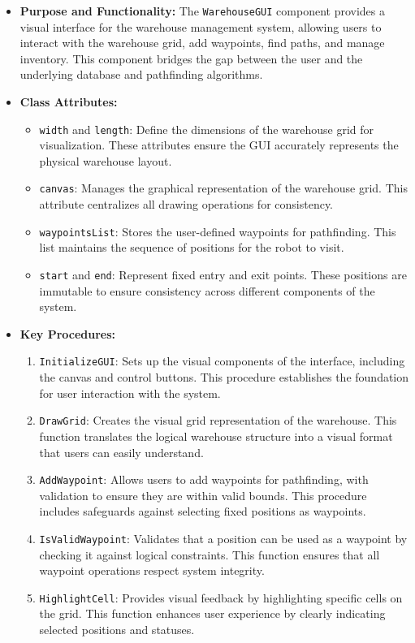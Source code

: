 \begin{itemize}
\item \textbf{Purpose and Functionality:}\newline
The \verb|WarehouseGUI| component provides a visual interface for the warehouse management system, allowing users to interact with the warehouse grid, add waypoints, find paths, and manage inventory. This component bridges the gap between the user and the underlying database and pathfinding algorithms.

\item \textbf{Class Attributes:}
\begin{itemize}
    \item {\verb|width| and \verb|length|:} Define the dimensions of the warehouse grid for visualization. These attributes ensure the GUI accurately represents the physical warehouse layout.
    \item {\verb|canvas|:} Manages the graphical representation of the warehouse grid. This attribute centralizes all drawing operations for consistency.
    \item {\verb|waypointsList|:} Stores the user-defined waypoints for pathfinding. This list maintains the sequence of positions for the robot to visit.
    \item {\verb|start| and \verb|end|:} Represent fixed entry and exit points. These positions are immutable to ensure consistency across different components of the system.
\end{itemize}

\item \textbf{Key Procedures:}
\begin{enumerate}
    \item {\verb|InitializeGUI|:} Sets up the visual components of the interface, including the canvas and control buttons. This procedure establishes the foundation for user interaction with the system.
    \item {\verb|DrawGrid|:} Creates the visual grid representation of the warehouse. This function translates the logical warehouse structure into a visual format that users can easily understand.
    \item {\verb|AddWaypoint|:} Allows users to add waypoints for pathfinding, with validation to ensure they are within valid bounds. This procedure includes safeguards against selecting fixed positions as waypoints.
    \item {\verb|IsValidWaypoint|:} Validates that a position can be used as a waypoint by checking it against logical constraints. This function ensures that all waypoint operations respect system integrity.
    \item {\verb|HighlightCell|:} Provides visual feedback by highlighting specific cells on the grid. This function enhances user experience by clearly indicating selected positions and statuses.
\end{enumerate}
\newpage


\end{itemize}
